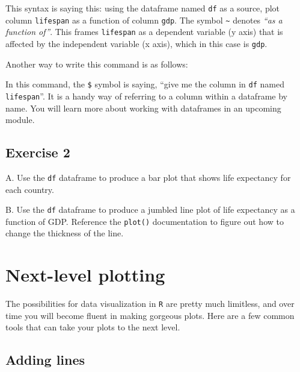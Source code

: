 \documentclass[
]{book}
\newenvironment{Shaded}{\begin{snugshade}}{\end{snugshade}}
\newcommand{\FunctionTok}[1]{\textcolor[rgb]{0.00,0.00,0.00}{#1}}
\newcommand{\NormalTok}[1]{#1}
\newcommand{\SpecialCharTok}[1]{\textcolor[rgb]{0.00,0.00,0.00}{#1}}
\begin{document}
This syntax is saying this: using the dataframe named \texttt{df} as a source, plot column \texttt{lifespan} as a function of column \texttt{gdp}. The symbol \texttt{\textasciitilde{}} denotes \emph{``as a function of''}. This frames \texttt{lifespan} as a dependent variable (y axis) that is affected by the independent variable (x axis), which in this case is \texttt{gdp}.

Another way to write this command is as follows:

\begin{Shaded}
\end{Shaded}

In this command, the \texttt{\$} symbol is saying, ``give me the column in \texttt{df} named \texttt{lifespan}''. It is a handy way of referring to a column within a dataframe by name. You will learn more about working with dataframes in an upcoming module.

\hypertarget{exercise-2-5}{%
\subsection*{Exercise 2}\label{exercise-2-5}}

A. Use the \texttt{df} dataframe to produce a bar plot that shows life expectancy for each country.

B. Use the \texttt{df} dataframe to produce a jumbled line plot of life expectancy as a function of GDP. Reference the \texttt{plot()} documentation to figure out how to change the thickness of the line.

\hypertarget{next-level-plotting}{%
\section*{Next-level plotting}\label{next-level-plotting}}

The possibilities for data visualization in \texttt{R} are pretty much limitless, and over time you will become fluent in making gorgeous plots. Here are a few common tools that can take your plots to the next level.

\hypertarget{adding-lines}{%
\subsection*{Adding lines}\label{adding-lines}}
\end{document}
